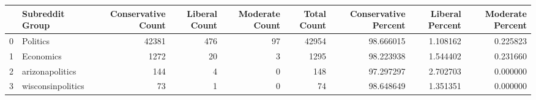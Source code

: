 \begin{tabular}{llrrrrrrr}
\toprule
{} &    Subreddit Group &  Conservative Count &  Liberal Count &  Moderate Count &  Total Count &  Conservative Percent &  Liberal Percent &  Moderate Percent \\
\midrule
0 &           Politics &               42381 &            476 &              97 &        42954 &             98.666015 &         1.108162 &          0.225823 \\
1 &          Economics &                1272 &             20 &               3 &         1295 &             98.223938 &         1.544402 &          0.231660 \\
2 &    arizonapolitics &                 144 &              4 &               0 &          148 &             97.297297 &         2.702703 &          0.000000 \\
3 &  wisconsinpolitics &                  73 &              1 &               0 &           74 &             98.648649 &         1.351351 &          0.000000 \\
\bottomrule
\end{tabular}
